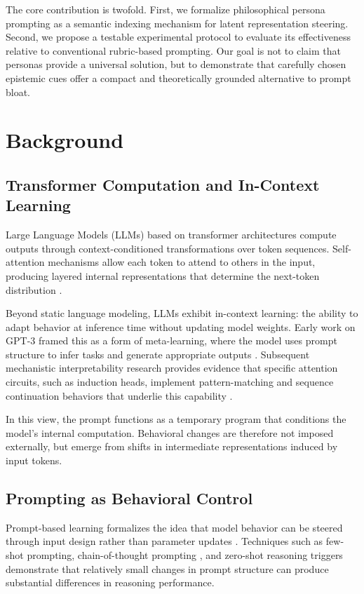 \documentclass[11pt]{article}
\begin{document}
The core contribution is twofold. First, we formalize philosophical persona prompting as a semantic indexing mechanism for latent representation steering. Second, we propose a testable experimental protocol to evaluate its effectiveness relative to conventional rubric-based prompting. Our goal is not to claim that personas provide a universal solution, but to demonstrate that carefully chosen epistemic cues offer a compact and theoretically grounded alternative to prompt bloat.

\section{Background}

\subsection{Transformer Computation and In-Context Learning}

Large Language Models (LLMs) based on transformer architectures compute outputs through context-conditioned transformations over token sequences. Self-attention mechanisms allow each token to attend to others in the input, producing layered internal representations that determine the next-token distribution \cite{vaswani2017attention}. 

Beyond static language modeling, LLMs exhibit in-context learning: the ability to adapt behavior at inference time without updating model weights. Early work on GPT-3 framed this as a form of meta-learning, where the model uses prompt structure to infer tasks and generate appropriate outputs \cite{brown2020gpt3}. Subsequent mechanistic interpretability research provides evidence that specific attention circuits, such as induction heads, implement pattern-matching and sequence continuation behaviors that underlie this capability \cite{olsson2022induction}.

In this view, the prompt functions as a temporary program that conditions the model’s internal computation. Behavioral changes are therefore not imposed externally, but emerge from shifts in intermediate representations induced by input tokens.

\subsection{Prompting as Behavioral Control}

Prompt-based learning formalizes the idea that model behavior can be steered through input design rather than parameter updates \cite{liu2021prompt}. Techniques such as few-shot prompting, chain-of-thought prompting \cite{wei2022cot}, and zero-shot reasoning triggers \cite{kojima2022zeroshot} demonstrate that relatively small changes in prompt structure can produce substantial differences in reasoning performance.
\end{document}
